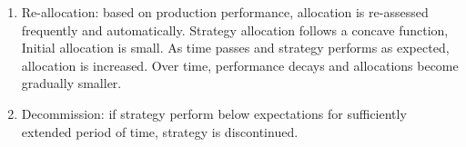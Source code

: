 \begin{method}
\begin{enumerate}[label=\roman*.]
\begin{enumerate}[label=\arabic*.]
\item Re-allocation: based on production performance, allocation is re-assessed frequently and automatically. Strategy allocation follows a concave function, Initial allocation is small. As time passes and strategy performs as expected, allocation is increased. Over time, performance decays and allocations become gradually smaller.
\item Decommission: if strategy perform below expectations for sufficiently extended period of time, strategy is discontinued.
\end{enumerate}
\end{enumerate}
\end{method}








